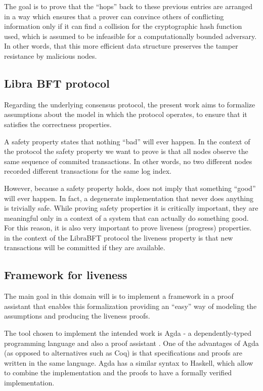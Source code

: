 The goal is to prove that the “hops” back to these previous entries are arranged in a way which ensures that a prover can convince others of conflicting information only if it can find a collision for the cryptographic hash function used, which is assumed to be infeasible for a computationally bounded adversary. In other words, that this more efficient data structure preserves the tamper resistance by malicious nodes. 


\subsection{Libra BFT protocol}
Regarding the underlying consensus protocol,  the present work aims to formalize assumptions about the model in which the protocol operates, to ensure that it satisfies the correctness properties.

A safety property states that nothing ``bad'' will ever happen. In the context of the protocol the safety property we want to prove is that all nodes observe the same sequence of commited transactions. In other words, no two different nodes recorded different transactions for the same log index.

However, because a safety property holds,  does not imply
that something ``good'' will ever happen. In fact, a degenerate implementation that never does anything is trivially safe. 
While proving safety properties it is critically important, they are meaningful 
only in a context of a system that can actually do something good. For this reason, it is also very important to prove liveness (progress) properties. in the context of the LibraBFT protocol the liveness property is that new transactions will be committed if they are available.

\subsection{Framework for liveness}


The main goal in this domain will is to implement a framework in a proof assistant that enables this formalization providing an ``easy'' way of modeling the assumptions and producing the liveness proofs.
\fi

\vspace{5mm}
The tool chosen to implement the intended work is Agda - a dependently-typed programming language and also a proof assistant \citep{plfa2019}. One of the advantages of Agda 
(as opposed to alternatives such as Coq) is that specifications and proofs are
written in the same language. Agda has a similar syntax to Haskell, which allow to combine the implementation and the proofs to have a formally verified implementation.




